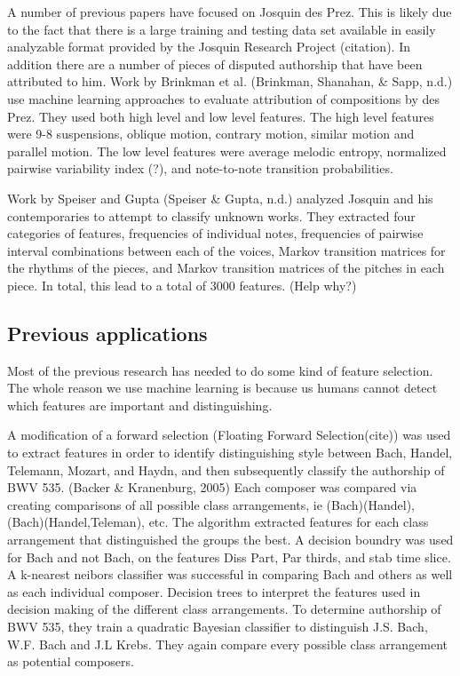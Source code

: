 \documentclass[12pt,twoside]{reedthesis}
\theoremstyle{definition}
\theoremstyle{definition}
\theoremstyle{definition}
\theoremstyle{remark}
\begin{document}
A number of previous papers have focused on Josquin des Prez. This is
likely due to the fact that there is a large training and testing data
set available in easily analyzable format provided by the Josquin
Research Project (citation). In addition there are a number of pieces of
disputed authorship that have been attributed to him. Work by Brinkman
et al. (Brinkman, Shanahan, \& Sapp, n.d.) use machine learning
approaches to evaluate attribution of compositions by des Prez. They
used both high level and low level features. The high level features
were 9-8 suspensions, oblique motion, contrary motion, similar motion
and parallel motion. The low level features were average melodic
entropy, normalized pairwise variability index (?), and note-to-note
transition probabilities.

Work by Speiser and Gupta (Speiser \& Gupta, n.d.) analyzed Josquin and
his contemporaries to attempt to classify unknown works. They extracted
four categories of features, frequencies of individual notes,
frequencies of pairwise interval combinations between each of the
voices, Markov transition matrices for the rhythms of the pieces, and
Markov transition matrices of the pitches in each piece. In total, this
lead to a total of 3000 features. (Help why?)

\subsection{Previous applications}\label{previous-applications}

Most of the previous research has needed to do some kind of feature
selection. The whole reason we use machine learning is because us humans
cannot detect which features are important and distinguishing.

A modification of a forward selection (Floating Forward Selection(cite))
was used to extract features in order to identify distinguishing style
between Bach, Handel, Telemann, Mozart, and Haydn, and then subsequently
classify the authorship of BWV 535. (Backer \& Kranenburg, 2005) Each
composer was compared via creating comparisons of all possible class
arrangements, ie (Bach)(Handel), (Bach)(Handel,Teleman), etc. The
algorithm extracted features for each class arrangement that
distinguished the groups the best. A decision boundry was used for Bach
and not Bach, on the features Diss Part, Par thirds, and stab time
slice. A k-nearest neibors classifier was successful in comparing Bach
and others as well as each individual composer. Decision trees to
interpret the features used in decision making of the different class
arrangements. To determine authorship of BWV 535, they train a quadratic
Bayesian classifier to distinguish J.S. Bach, W.F. Bach and J.L Krebs.
They again compare every possible class arrangement as potential
composers.
\end{document}
